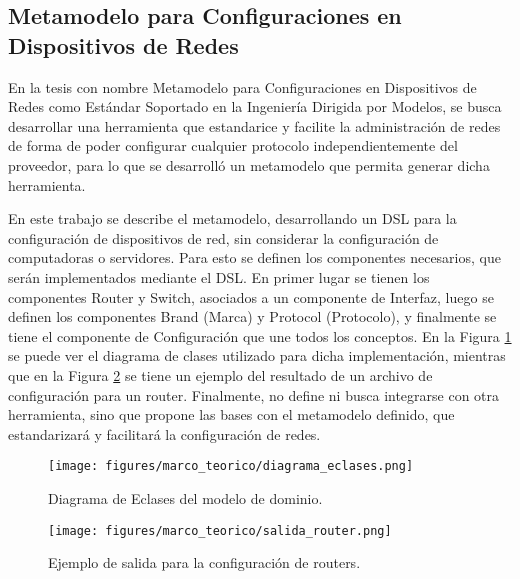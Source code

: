 \subsection{Metamodelo para Configuraciones en Dispositivos de Redes}
En la tesis con nombre Metamodelo para Configuraciones en Dispositivos de Redes como Estándar Soportado en la Ingeniería Dirigida por Modelos, 
se busca desarrollar una herramienta que estandarice y facilite la administración de redes de forma de poder configurar cualquier protocolo independientemente del proveedor, para lo que se desarrolló un metamodelo que permita generar dicha herramienta.

En este trabajo se describe el metamodelo, desarrollando un DSL para la configuración de dispositivos de red, sin considerar la configuración de computadoras o servidores. Para esto se definen los componentes necesarios, que serán implementados mediante el DSL. En primer lugar se tienen los componentes Router y Switch, asociados a un componente de Interfaz, luego se definen los componentes Brand (Marca) y Protocol (Protocolo), y finalmente se tiene el componente de Configuración que une todos los conceptos.  En la Figura \ref{fig:marco:eclassdiagram} se puede ver el diagrama de clases utilizado para dicha implementación, mientras que en la Figura \ref{fig:marco:routerconfigurationexample} se tiene un ejemplo del resultado de un archivo de configuración para un router.
Finalmente, no define ni busca integrarse con otra herramienta, sino que propone las bases con el metamodelo definido, que estandarizará y facilitará la configuración de redes. \cite{higuerametamodelo}

\begin{figure}[htbp]
    \centering
    \texttt{[image: figures/marco\_teorico/diagrama\_eclases.png]}
    \caption{Diagrama de Eclases del modelo de dominio. \cite{higuerametamodelo}}
    \label{fig:marco:eclassdiagram}
\end{figure}

\begin{figure}[htbp]
    \centering
    \texttt{[image: figures/marco\_teorico/salida\_router.png]}
    \caption{Ejemplo de salida para la configuración de routers. \cite{higuerametamodelo}}
    \label{fig:marco:routerconfigurationexample}
\end{figure}


